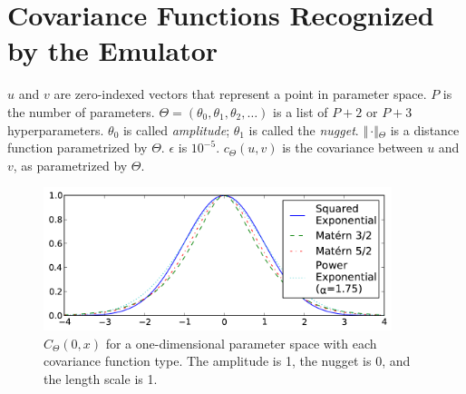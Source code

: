 
\section{Covariance Functions Recognized by the Emulator}
\label{sec:CovarianceFunctions}

$u$ and $v$ are zero-indexed vectors that represent a point in parameter space.  $P$ is the number of parameters. $\Theta=(\theta_0, \theta_1,\theta_2,\ldots)$ is a list of $P+2$ or $P+3$ hyperparameters. $\theta_0$ is called \emph{amplitude}; $\theta_1$ is called the \emph{nugget}.  $\Vert\,\cdotp\Vert{}_\Theta$ is a distance function parametrized by $\Theta$.  $\epsilon$ is $10^{-5}$. $c_\Theta{}(u, v)$ is the covariance between $u$ and $v$, as parametrized by $\Theta$.


\begin{figure}[b]
\includegraphics[width=4in]{figs/kernel_functions.pdf}
\parbox[b]{2.5in}
{\caption{\label{fig:kernelfunctions}
$C_\Theta{}(0, x)$ for a one-dimensional parameter space with each covariance function type. The amplitude is 1, the nugget is 0, and the length scale is 1.
\vspace*{30pt}
}}
\end{figure}



